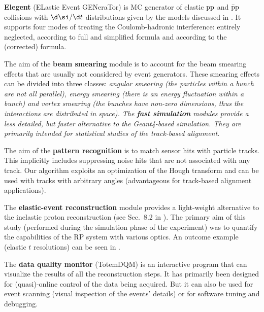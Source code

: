 \> {\bf Elegent} (ELastic Event GENeraTor) is MC generator of elastic $\rm pp$ and $\rm\bar pp$ collisions with $\d\si/\d t$ distributions given by the models discussed in . It supports four modes of treating the Coulomb-hadronic interference: entirely neglected, according to full and simplified \WY{} formula and according to the (corrected) \KL{} formula.

\> The aim of the {\bf beam smearing} module is to account for the beam smearing effects that are usually not considered by event generators. These smearing effects can be divided into three classes: \em{angular smearing} (the particles within a bunch are not all parallel), \em{energy smearing} (there is an energy fluctuation within a bunch) and \em{vertex smearing} (the bunches have non-zero dimensions, thus the interactions are distributed in space). 
\> The {\bf fast simulation} modules provide a less detailed, but faster alternative to the Geant4-based simulation. They are primarily intended for statistical studies of the track-based alignment.

\> The aim of the {\bf pattern recognition} is to match sensor hits with particle tracks. This implicitly includes suppressing noise hits that are not associated with any track. Our algorithm exploits an optimization of the Hough transform and can be used with tracks with arbitrary angles (advantageous for track-based alignment applications).

\> The {\bf elastic-event reconstruction} module provides a light-weight alternative to the inelastic proton reconstruction (see Sec.~8.2 in ). The primary aim of this study (performed during the simulation phase of the experiment) was to quantify the capabilities of the RP system with various optics. An outcome example (elastic $t$ resolutions) can be seen in .


\> The {\bf data quality monitor} (TotemDQM) is an interactive program that can visualize the results of all the reconstruction steps. It has primarily been designed for (quasi)-online control of the data being acquired. But it can also be used for event scanning (visual inspection of the events' details) or for software tuning and debugging.



